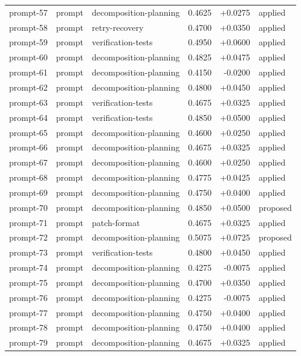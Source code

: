 \begin{center}
\begin{longtable}{llp{5.2cm}rrl}
prompt-57 & prompt & decomposition-planning & 0.4625 & +0.0275 & applied \\
prompt-58 & prompt & retry-recovery & 0.4700 & +0.0350 & applied \\
prompt-59 & prompt & verification-tests & 0.4950 & +0.0600 & applied \\
prompt-60 & prompt & decomposition-planning & 0.4825 & +0.0475 & applied \\
prompt-61 & prompt & decomposition-planning & 0.4150 & -0.0200 & applied \\
prompt-62 & prompt & decomposition-planning & 0.4800 & +0.0450 & applied \\
prompt-63 & prompt & verification-tests & 0.4675 & +0.0325 & applied \\
prompt-64 & prompt & verification-tests & 0.4850 & +0.0500 & applied \\
prompt-65 & prompt & decomposition-planning & 0.4600 & +0.0250 & applied \\
prompt-66 & prompt & decomposition-planning & 0.4675 & +0.0325 & applied \\
prompt-67 & prompt & decomposition-planning & 0.4600 & +0.0250 & applied \\
prompt-68 & prompt & decomposition-planning & 0.4775 & +0.0425 & applied \\
prompt-69 & prompt & decomposition-planning & 0.4750 & +0.0400 & applied \\
prompt-70 & prompt & decomposition-planning & 0.4850 & +0.0500 & proposed \\
prompt-71 & prompt & patch-format & 0.4675 & +0.0325 & applied \\
prompt-72 & prompt & decomposition-planning & 0.5075 & +0.0725 & proposed \\
prompt-73 & prompt & verification-tests & 0.4800 & +0.0450 & applied \\
prompt-74 & prompt & decomposition-planning & 0.4275 & -0.0075 & applied \\
prompt-75 & prompt & decomposition-planning & 0.4700 & +0.0350 & applied \\
prompt-76 & prompt & decomposition-planning & 0.4275 & -0.0075 & applied \\
prompt-77 & prompt & decomposition-planning & 0.4750 & +0.0400 & applied \\
prompt-78 & prompt & decomposition-planning & 0.4750 & +0.0400 & applied \\
prompt-79 & prompt & decomposition-planning & 0.4675 & +0.0325 & applied \\

\end{longtable}
\end{center}
